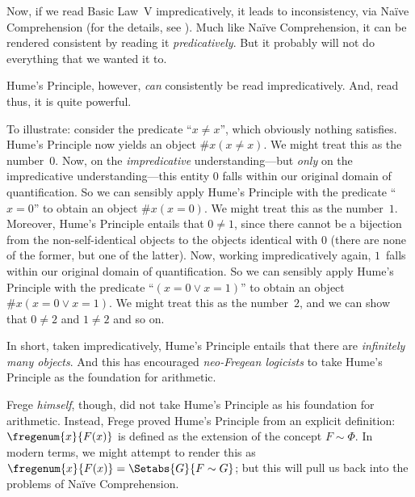 \documentclass[../../../include/open-logic-section]{subfiles}
\begin{document}
Now, if we read Basic Law~V impredicatively, it leads to
inconsistency, via Na\"ive Comprehension (for the details, see
). Much like Na\"ive Comprehension, it can be
rendered consistent by reading it \emph{predicatively}. But it
probably will not do everything that we wanted it to. 

Hume's Principle, however, \emph{can} consistently be read
impredicatively. And, read thus, it is quite powerful.

To illustrate: consider the predicate ``$x \neq x$'', which obviously
nothing satisfies. Hume's Principle now yields an object $\# x( x\neq
x)$. We might treat this as the number~$0$. Now, on the
\emph{impredicative} understanding---but \emph{only} on the
impredicative understanding---this entity $0$ falls within our
original domain of quantification. So we can sensibly apply Hume's
Principle with the predicate ``$x = 0$'' to obtain an object $\#x (x =
0)$. We might treat this as the number~$1$. Moreover, Hume's Principle
entails that $0 \neq 1$, since there cannot be a bijection from the
non-self-identical objects to the objects identical with $0$ (there
are none of the former, but one of the latter). Now, working
impredicatively again, $1$~falls within our original domain of
quantification. So we can sensibly apply Hume's Principle with the
predicate ``$(x = 0 \lor x = 1)$'' to obtain an object $\#x(x = 0 \lor
x = 1)$. We might treat this as the number~$2$, and we can show that
$0\neq 2$ and $1 \neq 2$ and so on. 

In short, taken impredicatively, Hume's Principle entails that there
are \emph{infinitely many objects}. And this has encouraged
\emph{neo-Fregean logicists} to take Hume's Principle as the
foundation for arithmetic. 

Frege \emph{himself}, though, did not take Hume's Principle as his
foundation for arithmetic. Instead, Frege proved Hume's Principle from
an explicit definition: $\fregenum{x}{F(x)}$ is defined as the extension of
the concept $F \sim \Phi$. In modern terms, we might attempt to render
this as $\fregenum{x}{F(x)} = \Setabs{G}{F \sim G}$; but this will pull us
back into the problems of Na\"ive Comprehension.
\end{document}
